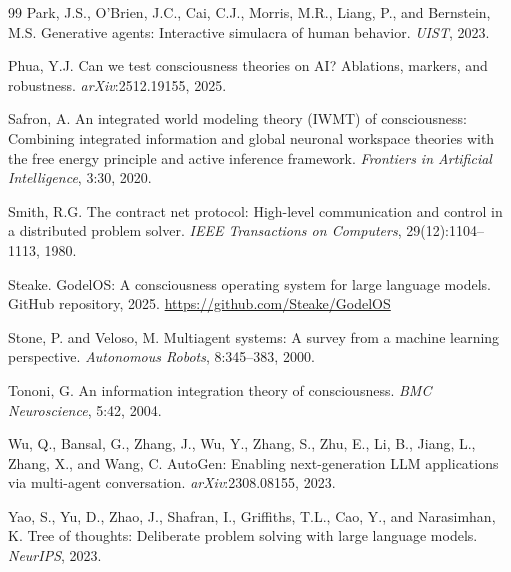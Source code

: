 \documentclass[11pt]{article}
\theoremstyle{definition}
\begin{document}
\begin{thebibliography}{99}
Park, J.S., O'Brien, J.C., Cai, C.J., Morris, M.R., Liang, P., and Bernstein, M.S.
Generative agents: Interactive simulacra of human behavior. \textit{UIST}, 2023.

Phua, Y.J. Can we test consciousness theories on AI? Ablations, markers, and robustness.
\textit{arXiv}:2512.19155, 2025.

Safron, A. An integrated world modeling theory (IWMT) of consciousness: Combining
integrated information and global neuronal workspace theories with the free energy principle
and active inference framework. \textit{Frontiers in Artificial Intelligence}, 3:30, 2020.

Smith, R.G. The contract net protocol: High-level communication and control in a distributed
problem solver. \textit{IEEE Transactions on Computers}, 29(12):1104--1113, 1980.

Steake. GodelOS: A consciousness operating system for large language models. GitHub
repository, 2025. \url{https://github.com/Steake/GodelOS}

Stone, P. and Veloso, M. Multiagent systems: A survey from a machine learning perspective.
\textit{Autonomous Robots}, 8:345--383, 2000.

Tononi, G. An information integration theory of consciousness. \textit{BMC Neuroscience},
5:42, 2004.

Wu, Q., Bansal, G., Zhang, J., Wu, Y., Zhang, S., Zhu, E., Li, B., Jiang, L., Zhang, X.,
and Wang, C. AutoGen: Enabling next-generation LLM applications via multi-agent conversation.
\textit{arXiv}:2308.08155, 2023.

Yao, S., Yu, D., Zhao, J., Shafran, I., Griffiths, T.L., Cao, Y., and Narasimhan, K.
Tree of thoughts: Deliberate problem solving with large language models.
\textit{NeurIPS}, 2023.

\end{thebibliography}
\end{document}
